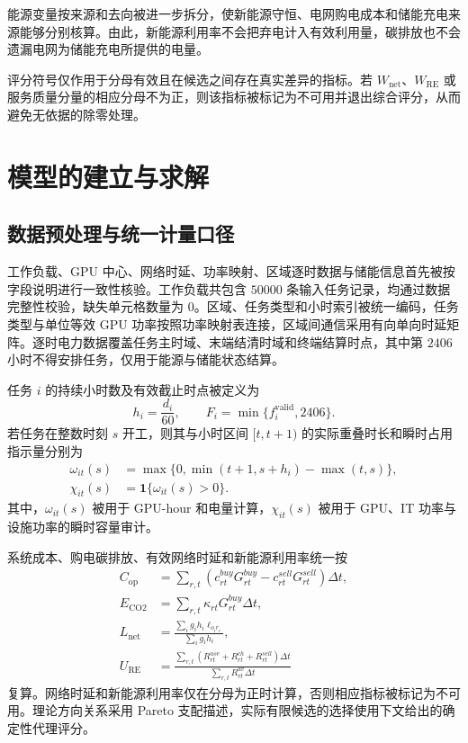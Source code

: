\documentclass[withoutpreface,bwprint]{cumcmthesis}
\begin{document}
能源变量按来源和去向被进一步拆分，使新能源守恒、电网购电成本和储能充电来源能够分别核算。由此，新能源利用率不会把弃电计入有效利用量，碳排放也不会遗漏电网为储能充电所提供的电量。

评分符号仅作用于分母有效且在候选之间存在真实差异的指标。若 $W_{\mathrm{net}}$、$W_{\mathrm{RE}}$ 或服务质量分量的相应分母不为正，则该指标被标记为不可用并退出综合评分，从而避免无依据的除零处理。

\section{模型的建立与求解}

\subsection{数据预处理与统一计量口径}

工作负载、GPU 中心、网络时延、功率映射、区域逐时数据与储能信息首先被按字段说明进行一致性核验。工作负载共包含 $50000$ 条输入任务记录，均通过数据完整性校验，缺失单元格数量为 $0$。区域、任务类型和小时索引被统一编码，任务类型与单位等效 GPU 功率按照功率映射表连接，区域间通信采用有向单向时延矩阵。逐时电力数据覆盖任务主时域、末端结清时域和终端结算时点，其中第 $2406$ 小时不得安排任务，仅用于能源与储能状态结算。

任务 $i$ 的持续小时数及有效截止时点被定义为
\begin{equation}
h_i=\frac{d_i}{60},\qquad F_i=\min\{f_i^{\mathrm{valid}},2406\}.
\label{eq:duration_deadline}
\end{equation}
若任务在整数时刻 $s$ 开工，则其与小时区间 $[t,t+1)$ 的实际重叠时长和瞬时占用指示量分别为
\begin{align}
\omega_{it}(s)&=\max\{0,\min(t+1,s+h_i)-\max(t,s)\},\\
\chi_{it}(s)&=\mathbf 1\{\omega_{it}(s)>0\}.
\end{align}
其中，$\omega_{it}(s)$ 被用于 GPU-hour 和电量计算，$\chi_{it}(s)$ 被用于 GPU、IT 功率与设施功率的瞬时容量审计。

系统成本、购电碳排放、有效网络时延和新能源利用率统一按
\begin{align}
C_{\mathrm{op}}
&=\sum_{r,t}\left(c_{rt}^{buy}G_{rt}^{buy}
-c_{rt}^{sell}G_{rt}^{sell}\right)\Delta t,\\
E_{\mathrm{CO2}}
&=\sum_{r,t}\kappa_{rt}G_{rt}^{buy}\Delta t,\\
L_{\mathrm{net}}
&=\frac{\sum_i g_ih_i\ell_{o_ir_i}}{\sum_i g_ih_i},\\
U_{\mathrm{RE}}
&=\frac{\sum_{r,t}(R_{rt}^{use}+R_{rt}^{ch}+R_{rt}^{sell})\Delta t}
{\sum_{r,t}R_{rt}^{av}\Delta t}
\end{align}
复算。网络时延和新能源利用率仅在分母为正时计算，否则相应指标被标记为不可用。理论方向关系采用 Pareto 支配描述，实际有限候选的选择使用下文给出的确定性代理评分\cite{huber1964robust,miettinen1999nonlinear}。
\end{document}
